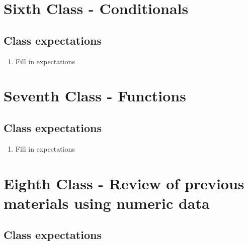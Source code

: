 \documentclass[paper=a4, fontsize=11pt]{scrartcl} %
\numberwithin{equation}{section} %
\numberwithin{figure}{section} %
\numberwithin{table}{section} %
\begin{document}
\section{Sixth Class - Conditionals}


\subsection{Class expectations}

\begin{enumerate}
\item Fill in expectations
\end{enumerate}


\section{Seventh Class - Functions}


\subsection{Class expectations}

\begin{enumerate}
\item Fill in expectations
\end{enumerate}


\section{Eighth Class - Review of previous materials using numeric data}


\subsection{Class expectations}
\end{document}
